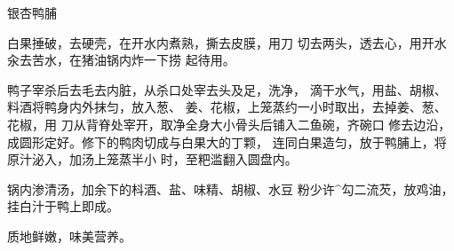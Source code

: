 \begin{recipe}{银杏鸭脯}

\ingredients



\cooking

\step 	白果捶破，去硬壳，在开水内煮熟，撕去皮膜，用刀 切去两头，透去心，用开水汆去苦水，在猪油锅内炸一下捞 起待用。

\step 	鸭子宰杀后去毛去内脏，从杀口处宰去头及足，洗净， 滴干水气，用盐、胡椒、料酒将鸭身内外抹匀，放入葱、 姜、花椒，上笼蒸约一小时取出，去掉姜、葱、花椒，用 刀从背脊处宰开，取净全身大小骨头后铺入二鱼碗，齐碗口 修去边沿，成圆形定好。修下的鸭肉切成与白果大的丁颗， 连同白果造匀，放于鸭脯上，将原汁泌入，加汤上笼蒸半小 时，至粑滥翻入圆盘内。

\step 	锅内渗清汤，加余下的枓酒、盐、味精、胡椒、水豆 粉少许^勾二流芡，放鸡油，挂白汁于鸭上即成。

\notes

质地鲜嫩，味美营养。

\end{recipe}

